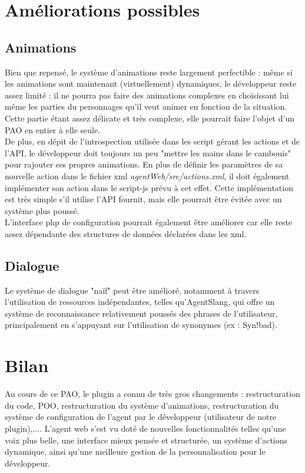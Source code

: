 \documentclass[11pt,dvipsnames,svgnames]{report}
\begin{document}
	\chapter{Améliorations possibles}
	
	\section{Animations}
	Bien que repensé, le système d'animations reste largement perfectible : même si les animations sont maintenant (virtuellement) dynamiques, le développeur reste assez limité : il ne pourra pas faire des animations complexes en choisissant lui même les parties du personnages qu'il veut animer en fonction de la situation. Cette partie étant assez délicate et très complexe, elle pourrait faire l'objet d'un PAO en entier à elle seule.\\
	
	De plus, en dépit de l'introspection utilisée dans les script gérant les actions et de l'API, le développeur doit toujours un peu "mettre les mains dans le cambouis" pour rajouter ses propres animations. En plus de définir les paramètres de sa nouvelle action dans le fichier xml \emph{agentWeb/src/actions.xml}, il doit également implémenter son action dans le script-js prévu à cet effet. Cette implémentation est très simple s'il utilise l'API fournit, mais elle pourrait être évitée avec un système plus poussé. \\
	
	L'interface php de configuration pourrait également être améliorer car elle reste assez dépendante des structures de données déclarées dans les xml.
	
	
	\section{Dialogue}
	
	Le système de dialogue "naïf" peut être amélioré, notamment à travers l'utilisation de ressources indépendantes, telles qu'AgentSlang, qui offre un système de reconnaissance relativement poussés des phrases de l'utilisateur, principalement en s'appuyant sur l'utilisation de synonymes (ex : Syn!bad).
	
	\chapter{Bilan}
	
	Au cours de ce PAO, le plugin a connu de très gros changements : restructuration du code, POO, restructuration du système d'animations, restructuration du système de configuration de l'agent par le développeur (utilisateur de notre plugin),.... L'agent web s'est vu doté de nouvelles fonctionnalités telles qu'une voix plus belle, une interface mieux pensée et structurée, un système d'actions dynamique, ainsi qu'une meilleure gestion de la personnalisation pour le développeur. \\
	
\end{document}
